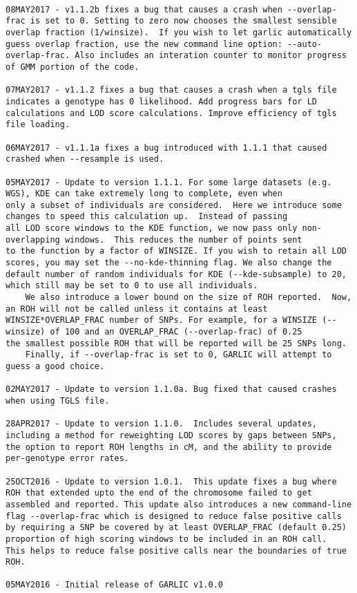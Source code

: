 \documentclass[12pt]{article}%
\begin{document}
\begin{lstlisting}

08MAY2017 - v1.1.2b fixes a bug that causes a crash when --overlap-frac is set to 0. Setting to zero now chooses the smallest sensible overlap fraction (1/winsize).  If you wish to let garlic automatically guess overlap fraction, use the new command line option: --auto-overlap-frac. Also includes an interation counter to monitor progress of GMM portion of the code.

07MAY2017 - v1.1.2 fixes a bug that causes a crash when a tgls file indicates a genotype has 0 likelihood. Add progress bars for LD calculations and LOD score calculations. Improve efficiency of tgls file loading.

06MAY2017 - v1.1.1a fixes a bug introduced with 1.1.1 that caused crashed when --resample is used.

05MAY2017 - Update to version 1.1.1. For some large datasets (e.g. WGS), KDE can take extremely long to complete, even when
only a subset of individuals are considered.  Here we introduce some changes to speed this calculation up.  Instead of passing
all LOD score windows to the KDE function, we now pass only non-overlapping windows.  This reduces the number of points sent
to the function by a factor of WINSIZE. If you wish to retain all LOD scores, you may set the --no-kde-thinning flag. We also change the default number of random individuals for KDE (--kde-subsample) to 20, which still may be set to 0 to use all individuals. 
	We also introduce a lower bound on the size of ROH reported.  Now, an ROH will not be called unless it contains at least
WINSIZE*OVERLAP_FRAC number of SNPs. For example, for a WINSIZE (--winsize) of 100 and an OVERLAP_FRAC (--overlap-frac) of 0.25
the smallest possible ROH that will be reported will be 25 SNPs long.
	Finally, if --overlap-frac is set to 0, GARLIC will attempt to guess a good choice.

02MAY2017 - Update to version 1.1.0a. Bug fixed that caused crashes when using TGLS file. 

28APR2017 - Update to version 1.1.0.  Includes several updates, including a method for reweighting LOD scores by gaps between SNPs, the option to report ROH lengths in cM, and the ability to provide per-genotype error rates.

25OCT2016 - Update to version 1.0.1.  This update fixes a bug where ROH that extended upto the end of the chromosome failed to get assembled and reported. This update also introduces a new command-line flag --overlap-frac which is designed to reduce false positive calls by requiring a SNP be covered by at least OVERLAP_FRAC (default 0.25) proportion of high scoring windows to be included in an ROH call.  This helps to reduce false positive calls near the boundaries of true ROH.

05MAY2016 - Initial release of GARLIC v1.0.0
\end{lstlisting}


\end{document}
